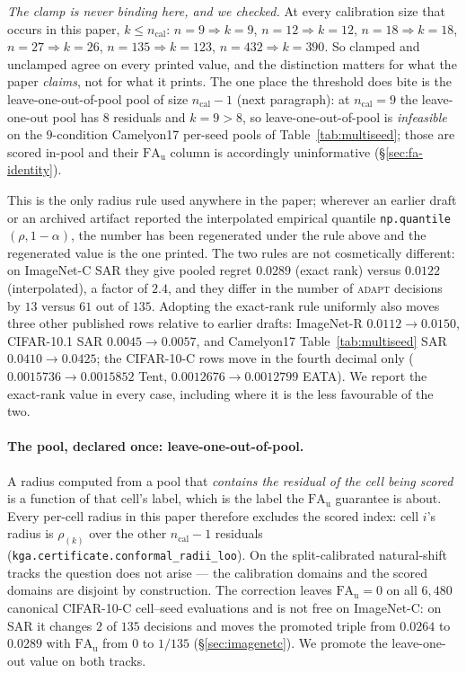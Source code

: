 \emph{The clamp is never binding here, and we checked.} At every calibration size that occurs in
this paper, $k\le n_{\mathrm{cal}}$: $n{=}9\Rightarrow k{=}9$, $n{=}12\Rightarrow k{=}12$,
$n{=}18\Rightarrow k{=}18$, $n{=}27\Rightarrow k{=}26$, $n{=}135\Rightarrow k{=}123$,
$n{=}432\Rightarrow k{=}390$. So clamped and unclamped agree on every printed value, and the
distinction matters for what the paper \emph{claims}, not for what it prints. The one place the
threshold does bite is the leave-one-out-of-pool pool of size $n_{\mathrm{cal}}-1$
(next paragraph): at $n_{\mathrm{cal}}=9$ the leave-one-out pool has $8$ residuals and $k=9>8$, so
leave-one-out-of-pool is \emph{infeasible} on the $9$-condition Camelyon17 per-seed pools of
Table~\ref{tab:multiseed}; those are scored in-pool and their
$\mathrm{FA}_{\mathrm u}$ column is accordingly uninformative (\S\ref{sec:fa-identity}).

This is the only radius rule used anywhere in the paper; wherever an earlier
draft or an archived artifact reported the interpolated empirical quantile
\texttt{np.quantile}$(\rho,1-\alpha)$, the number has been regenerated under the rule above and the
regenerated value is the one printed. The two rules are not cosmetically different: on ImageNet-C SAR
they give pooled regret $0.0289$ (exact rank) versus $0.0122$ (interpolated), a factor of $2.4$, and
they differ in the number of \textsc{adapt} decisions by $13$ versus $61$ out of $135$. Adopting the
exact-rank rule uniformly also moves three other published rows relative to earlier drafts:
ImageNet-R $0.0112\to0.0150$, CIFAR-10.1 SAR $0.0045\to0.0057$, and Camelyon17 Table~\ref{tab:multiseed}
SAR $0.0410\to0.0425$; the CIFAR-10-C rows move in the fourth decimal only
($0.0015736\to0.0015852$ Tent, $0.0012676\to0.0012799$ EATA). We report the exact-rank value in every
case, including where it is the less favourable of the two.

\paragraph{The pool, declared once: leave-one-out-of-pool.}\label{par:loo-pool}
A radius computed from a pool that \emph{contains the residual of the cell being scored} is a
function of that cell's label, which is the label the $\mathrm{FA}_{\mathrm u}$ guarantee is about.
Every per-cell radius in this paper therefore excludes the scored index: cell $i$'s radius is
$\rho_{(k)}$ over the other $n_{\mathrm{cal}}-1$ residuals
(\texttt{kga.certificate.conformal\_radii\_loo}). On the split-calibrated natural-shift tracks the
question does not arise --- the calibration domains and the scored domains are disjoint by
construction. The correction leaves $\mathrm{FA}_{\mathrm u}=0$ on all $6{,}480$ canonical
CIFAR-10-C cell--seed evaluations and is not free on ImageNet-C: on SAR it changes $2$ of $135$
decisions and moves the promoted
triple from $0.0264$ to $0.0289$ with $\mathrm{FA}_{\mathrm u}$ from $0$ to $1/135$
(\S\ref{sec:imagenetc}). We promote the leave-one-out value on both tracks.

